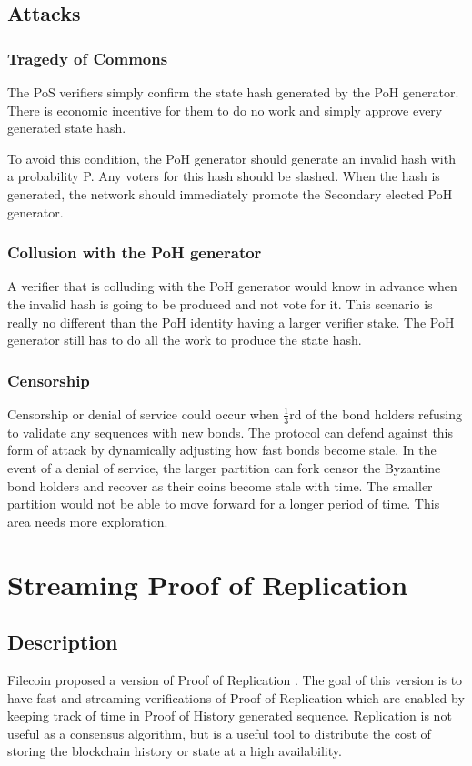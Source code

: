\documentclass[12pt]{article}
\begin{document}
\subsection{Attacks}
\subsubsection{Tragedy of Commons}

The PoS verifiers simply confirm the state hash generated by the PoH generator.  There is economic incentive for them to do no work and simply approve every generated state hash.  

To avoid this condition, the PoH generator should generate an invalid hash with a probability P.  Any voters for this hash should be slashed.  When the hash is generated, the network should immediately promote the Secondary elected PoH generator.

\subsubsection{Collusion with the PoH generator}\label{subsubsec:collusion}
A verifier that is colluding with the PoH generator would know in advance when the invalid hash is going to be produced and not vote for it.  This scenario is really no different than the PoH identity having a larger verifier stake.  The PoH generator still has to do all the work to produce the state hash.
\subsubsection{Censorship}\label{subsubsec:collusion}
Censorship or denial of service could occur when \(\frac{1}{3}\)rd of the bond holders refusing to validate any sequences with new bonds. The protocol can defend against this form of attack by dynamically adjusting how fast bonds become stale.  In the event of a denial of service, the larger partition can fork censor the Byzantine bond holders and recover as their coins become stale with time. The smaller partition would not be able to move forward for a longer period of time.  This area needs more exploration.

\section{Streaming Proof of Replication}\label{porep}
\subsection{Description}
Filecoin proposed a version of Proof of Replication \cite{filecoinporep}.  The goal of this version is to have fast and streaming verifications of Proof of Replication which are enabled by keeping track of time in Proof of History generated sequence.  Replication is not useful as a consensus algorithm, but is a useful tool to distribute the cost of storing the blockchain history or state at a high availability.
\end{document}

